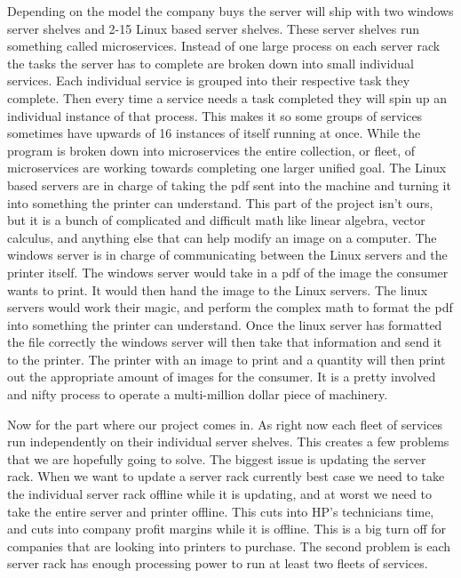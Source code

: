 \documentclass[onecolumn, draftclsnofoot,10pt, compsoc]{IEEEtran}
\begin{document}
Depending on the model the company buys the server will ship with two windows server shelves and 2-15 Linux based server shelves. These server shelves run something called microservices. Instead of one large process on each server rack the tasks the server has to complete are broken down into small individual services. Each individual service is grouped into their respective task they complete. Then every time a service needs a task completed they will spin up an individual instance of that process. This makes it so some groups of services sometimes have upwards of 16 instances of itself running at once. While the program is broken down into microservices the entire collection, or fleet, of microservices are working towards completing one larger unified goal. The Linux based servers are in charge of taking the pdf sent into the machine and turning it into something the printer can understand. This part of the project isn’t ours, but it is a bunch of complicated and difficult math like linear algebra, vector calculus, and anything else that can help modify an image on a computer. The windows server is in charge of communicating between the Linux servers and the printer itself. The windows server would take in a pdf of the image the consumer wants to print. It would then hand the image to the Linux servers. The linux servers would work their magic, and perform the complex math to format the pdf into something the printer can understand. Once the linux server has formatted the file correctly the windows server will then take that information and send it to the printer. The printer with an image to print and a quantity will then print out the appropriate amount of images for the consumer. It is a pretty involved and nifty process to operate a multi-million dollar piece of machinery.

Now for the part where our project comes in. As right now each fleet of services run independently on their individual server shelves. This creates a few problems that we are hopefully going to solve. The biggest issue is updating the server rack. When we want to update a server rack currently best case we need to take the individual server rack offline while it is updating, and at worst we need to take the entire server and printer offline. This cuts into HP’s technicians time, and cuts into company profit margins while it is offline. This is a big turn off for companies that are looking into printers to purchase. The second problem is each server rack has enough processing power to run at least two fleets of services. 
\end{document}
